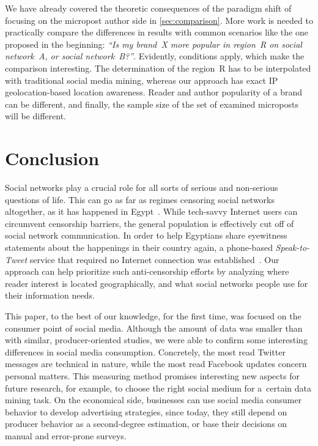 \documentclass{iosart2c}
\begin{document}
We have already covered the theoretic consequences of the paradigm shift of focusing on the micropost author side in \autoref{sec:comparison}.
More work is needed to practically compare the differences in results with common scenarios like the one proposed in the beginning: \textit{``Is my brand~X more popular in region~R on social network~A, or social network~B?''}.
Evidently, conditions apply, which make the comparison interesting.
The determination of the region~R has to be interpolated with traditional social media mining, whereas our approach has exact IP geolocation-based location awareness.
Reader and author popularity of a brand can be different, and finally, the sample size of the set of examined microposts will be different.

\section{Conclusion} \label{sec:conclusion}
Social networks play a crucial role for all sorts of serious and non-serious questions of life.
This can go as far as regimes censoring social networks altogether, as it has happened in Egypt~\cite{censor}.
While tech-savvy Internet users can circumvent censorship barriers, the general population is effectively cut off of social network communication.
In order to help Egyptians share eyewitness statements about the happenings in their country again, a phone-based \emph{Speak-to-Tweet} service that required no Internet connection was established~\cite{egypt}.
Our approach can help prioritize such anti-censorship efforts by analyzing where reader interest is located geographically, and what social networks people use for their information needs.

This paper, to the best of our knowledge, for the first time, was focused on the consumer point of social media.
Although the amount of data was smaller than with similar, producer-oriented studies, we were able to confirm some interesting differences in social media consumption.
Concretely, the most read Twitter messages are technical in nature, while the most read Facebook updates concern personal matters.
This measuring method promises interesting new aspects for future research, for example, to choose the right social medium for a~certain data mining task.
On the economical side, businesses can use social media consumer behavior to develop advertising strategies, since today, they still depend on producer behavior as a second-degree estimation, or base their decisions on manual and error-prone surveys.
\end{document}
